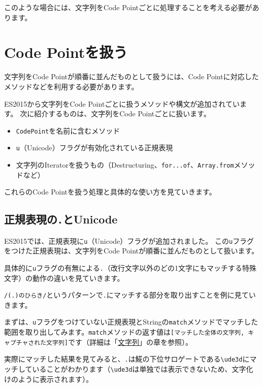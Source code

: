 このような場合には、文字列をCode
Pointごとに処理することを考える必要があります。

\hypertarget{handle-code-point}{%
\section{Code Pointを扱う}\label{handle-code-point}}

文字列をCode Pointが順番に並んだものとして扱うには、Code
Pointに対応したメソッドなどを利用する必要があります。

ES2015から文字列をCode Pointごとに扱うメソッドや構文が追加されています。
次に紹介するものは、文字列をCode Pointごとに扱います。

\enlargethispage{\baselineskip}\begin{itemize}
\item
  \texttt{CodePoint}を名前に含むメソッド
\item
  \texttt{u}（Unicode）フラグが有効化されている正規表現
\item
  文字列のIteratorを扱うもの（Destructuring、\texttt{for...of}、\texttt{Array.from}メソッドなど）
\end{itemize}

これらのCode Pointを扱う処理と具体的な使い方を見ていきます。

\hypertarget{regexp-unicode}{%
\subsection{\texorpdfstring{正規表現の\texttt{.}とUnicode}{正規表現の.とUnicode}}\label{regexp-unicode}}

ES2015では、正規表現に\texttt{u}（Unicode）フラグが追加されました。
この\texttt{u}フラグをつけた正規表現は、文字列をCode
Pointが順番に並んだものとして扱います。

具体的に\texttt{u}フラグの有無による\texttt{.}（改行文字以外のどの1文字にもマッチする特殊文字）の動作の違いを見ていきます。

\texttt{/(.)のひらき/}というパターンで\texttt{.}にマッチする部分を取り出すことを例に見ていきます。

まずは、\texttt{u}フラグをつけていない正規表現とStringの\texttt{match}メソッドでマッチした範囲を取り出してみます。\texttt{match}メソッドの返す値は\texttt{[マッチした全体の文字列, キャプチャされた文字列]}です（詳細は「\hyperlink{string}{文字列}」の章を参照）。

実際にマッチした結果を見てみると、\texttt{.}は𩸽の下位サロゲートである\texttt{\textbackslash ude3d}にマッチしていることがわかります（\texttt{\textbackslash ude3d}は単独では表示できないため、文字化けのように表示されます）。

